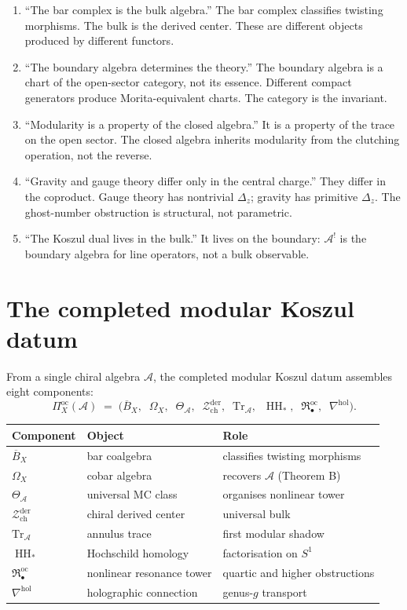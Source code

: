 \documentclass[11pt]{article}
\newcommand{\cA}{\mathcal{A}}
\newcommand{\cZ}{\mathcal{Z}}
\newcommand{\barB}{\overline{B}}
\newcommand{\HH}{\operatorname{HH}}
\newcommand{\Zder}{\cZ^{\mathrm{der}}_{\mathrm{ch}}}
\begin{document}
\begin{enumerate}[nosep]
\item ``The bar complex is the bulk algebra.''  The bar complex
  classifies twisting morphisms.  The bulk is the derived center.
  These are different objects produced by different functors.
\item ``The boundary algebra determines the theory.''  The boundary
  algebra is a chart of the open-sector category, not its essence.
  Different compact generators produce Morita-equivalent charts.
  The category is the invariant.
\item ``Modularity is a property of the closed algebra.''  It is a
  property of the trace on the open sector.  The closed algebra
  inherits modularity from the clutching operation, not the reverse.
\item ``Gravity and gauge theory differ only in the central
  charge.''  They differ in the coproduct.  Gauge theory has
  nontrivial $\Delta_z$; gravity has primitive $\Delta_z$.  The
  ghost-number obstruction is structural, not parametric.
\item ``The Koszul dual lives in the bulk.''  It lives on the
  boundary: $\cA^!$ is the boundary algebra for line operators,
  not a bulk observable.
\end{enumerate}


\section{The completed modular Koszul datum}
\label{sec:platonic}

From a single chiral algebra $\cA$, the completed modular Koszul datum
assembles eight components:
\[
\Pi^{\mathrm{oc}}_X(\cA)
\;=\;
\bigl(\barB_X,\;\; \Omega_X,\;\; \Theta_\cA,\;\;
\Zder,\;\; \mathrm{Tr}_\cA,\;\;
\HH_*,\;\; \mathfrak{R}^{\mathrm{oc}}_\bullet,\;\;
\nabla^{\mathrm{hol}}\bigr).
\]

\begin{center}
\small
\renewcommand{\arraystretch}{1.15}
\begin{tabular}{@{}lll@{}}
\textbf{Component} & \textbf{Object} & \textbf{Role} \\
\hline
$\barB_X$ & bar coalgebra & classifies twisting morphisms \\[3pt]
$\Omega_X$ & cobar algebra & recovers $\cA$ (Theorem B) \\[3pt]
$\Theta_\cA$ & universal MC class & organises nonlinear tower \\[3pt]
$\Zder$ & chiral derived center & universal bulk \\[3pt]
$\mathrm{Tr}_\cA$ & annulus trace
  & first modular shadow \\[3pt]
$\HH_*$ & Hochschild homology & factorisation on $S^1$ \\[3pt]
$\mathfrak{R}^{\mathrm{oc}}_\bullet$ & nonlinear resonance tower
  & quartic and higher obstructions \\[3pt]
$\nabla^{\mathrm{hol}}$ & holographic connection
  & genus-$g$ transport
\end{tabular}
\end{center}
\end{document}
